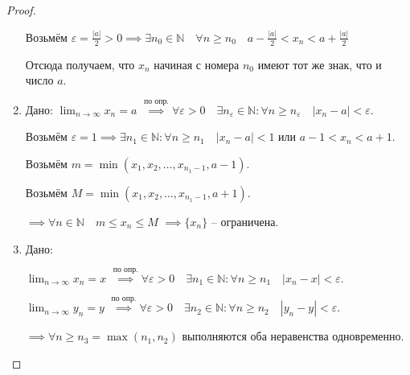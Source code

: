 \documentclass[a4paper,oneside]{article}
\newcommand{\bydef}{\stackrel{\text{по опр.}}{\implies}} %
\newcommand{\dslim}{\displaystyle\lim}
\newcommand{\dslimn}{\dslim_{n \to \infty}}
\theoremstyle{definition}
\theoremstyle{definition}
\theoremstyle{definition}
\begin{document}
\begin{proof}
\begin{enumerate}
            Возьмём $\varepsilon = \frac{\left| a \right|}{2} > 0 \implies 
            \exists n_0 \in \mathbb{N} \quad \forall n \ge n_0 \quad
            a - \frac{\left| a \right|}{2} < x_n < a + \frac{\left| a \right|}{2}$
        
            Отсюда получаем, что $x_n$ начиная с номера $n_0$ имеют тот же знак, что и число $a$.
    
        \item 
            Дано: $\dslimn x_n = a$
            $\bydef \forall \varepsilon > 0 \quad
            \exists n_\varepsilon \in \mathbb{N}: \forall n \ge n_\varepsilon \quad
            \left| x_n - a \right| < \varepsilon$.
        
            Возьмём $\varepsilon = 1 \implies \exists n_1 \in \mathbb{N}: \forall n \ge n_1 \quad
            \left| x_n - a \right| < 1$ или $a - 1 < x_n < a + 1$.
        
            Возьмём $m = \min \left( x_1, x_2, \dots, x_{n_1 - 1}, a - 1 \right)$.
        
            Возьмём $M = \min \left( x_1, x_2, \dots, x_{n_1 - 1}, a + 1 \right)$.
        
            $\implies \forall n \in \mathbb{N} \quad m \le x_n \le M$ $\implies \{x_n\}$ -- ограничена.
    
        \item 
            Дано:
            
            $\dslimn x_n = x$
            $\bydef \forall \varepsilon > 0 \quad
            \exists n_1 \in \mathbb{N}: \forall n \ge n_1 \quad
            \left| x_n - x \right| < \varepsilon$.
        
            $\dslimn y_n = y$
            $\bydef \forall \varepsilon > 0 \quad
            \exists n_2 \in \mathbb{N}: \forall n \ge n_2 \quad
            \left| y_n - y \right| < \varepsilon$.
        
            $\implies \forall n \ge n_3 = \max \left( n_1, n_2 \right)$ 
            выполняются оба неравенства одновременно.
        

\end{enumerate}
\end{proof}
\end{document}
